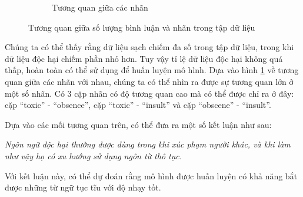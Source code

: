 \begin{figure}[htb!]
\begin{subfigure}{0.5\textwidth}
        \caption{Tương quan giữa các nhãn}
    \end{subfigure}%
    \caption{Tương quan giữa số lượng bình luận và nhãn trong tập dữ liệu}
    \label{figure:number_of_records_and_labels}
\end{figure}

Chúng ta có thể thấy rằng dữ liệu sạch chiếm đa số trong tập dữ liệu, trong khi dữ liệu độc hại chiếm phần nhỏ hơn. Tuy vậy tỉ lệ dữ liệu độc hại không quá thấp, hoàn toàn có thể sử dụng để huấn luyện mô hình. Dựa vào hình \ref{figure:number_of_records_and_labels} về tương quan giữa các nhãn với nhau, chúng ta có thể nhìn ra được sự tương quan lớn ở một số nhãn. Có 3 cặp nhãn có độ tương quan cao mà có thể được chỉ ra ở đây: cặp ``toxic'' - ``obsence'', cặp ``toxic'' - ``insult'' và cặp ``obscene'' - ``insult''.

Dựa vào các mối tương quan trên, có thể đưa ra một số kết luận như sau:

\textit{Ngôn ngữ độc hại thường được dùng trong khi xúc phạm người khác, và khi làm như vậy họ có xu hướng sử dụng ngôn từ thô tục.}

Với kết luận này, có thể dự đoán rằng mô hình được huấn luyện có khả năng bắt được những từ ngữ tục tĩu với độ nhạy tốt.

